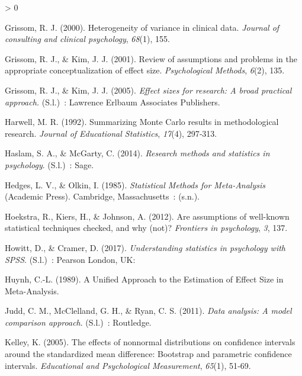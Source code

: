 \documentclass[
  12pt,
  french,
]{article}
\newlength{\cslhangindent}
\newenvironment{CSLReferences}[2] %
 {%
  \setlength{\parindent}{0pt}
  \ifodd #1 \everypar{\setlength{\hangindent}{\cslhangindent}}\ignorespaces\fi
  \ifnum #2 > 0
  \setlength{\parskip}{#2\baselineskip}
  \fi
 }%
 {}
\begin{document}
\begin{CSLReferences}{1}{0}
\leavevmode\hypertarget{ref-grissom_heterogeneity_2000}{}%
Grissom, R. J. (2000). Heterogeneity of variance in clinical data.
\emph{Journal of consulting and clinical psychology}, \emph{68}(1), 155.

\leavevmode\hypertarget{ref-grissom_review_2001}{}%
Grissom, R. J., \& Kim, J. J. (2001). Review of assumptions and problems
in the appropriate conceptualization of effect size. \emph{Psychological
Methods}, \emph{6}(2), 135.

\leavevmode\hypertarget{ref-grissom_effect_2005}{}%
Grissom, R. J., \& Kim, J. J. (2005). \emph{Effect sizes for research: A
broad practical approach.} (S.l.)~: Lawrence Erlbaum Associates
Publishers.

\leavevmode\hypertarget{ref-harwell_summarizing_1992}{}%
Harwell, M. R. (1992). Summarizing Monte Carlo results in methodological
research. \emph{Journal of Educational Statistics}, \emph{17}(4),
297‑313.

\leavevmode\hypertarget{ref-haslam_research_2014}{}%
Haslam, S. A., \& McGarty, C. (2014). \emph{Research methods and
statistics in psychology}. (S.l.)~: Sage.

\leavevmode\hypertarget{ref-hedges_statistical_1985}{}%
Hedges, L. V., \& Olkin, I. (1985). \emph{Statistical Methods for
Meta-Analysis} (Academic Press). Cambridge, Massachusetts~: (s.n.).

\leavevmode\hypertarget{ref-hoekstra_are_2012}{}%
Hoekstra, R., Kiers, H., \& Johnson, A. (2012). Are assumptions of
well-known statistical techniques checked, and why (not)?
\emph{Frontiers in psychology}, \emph{3}, 137.

\leavevmode\hypertarget{ref-howitt_understanding_2017}{}%
Howitt, D., \& Cramer, D. (2017). \emph{Understanding statistics in
psychology with {SPSS}}. (S.l.)~: Pearson London, {UK}:

\leavevmode\hypertarget{ref-huynh_unified_1989}{}%
Huynh, C.-L. (1989). A Unified Approach to the Estimation of Effect Size
in Meta-Analysis.

\leavevmode\hypertarget{ref-judd_data_2011}{}%
Judd, C. M., McClelland, G. H., \& Ryan, C. S. (2011). \emph{Data
analysis: A model comparison approach}. (S.l.)~: Routledge.

\leavevmode\hypertarget{ref-kelley_effects_2005}{}%
Kelley, K. (2005). The effects of nonnormal distributions on confidence
intervals around the standardized mean difference: Bootstrap and
parametric confidence intervals. \emph{Educational and Psychological
Measurement}, \emph{65}(1), 51‑69.


\end{CSLReferences}
\end{document}
